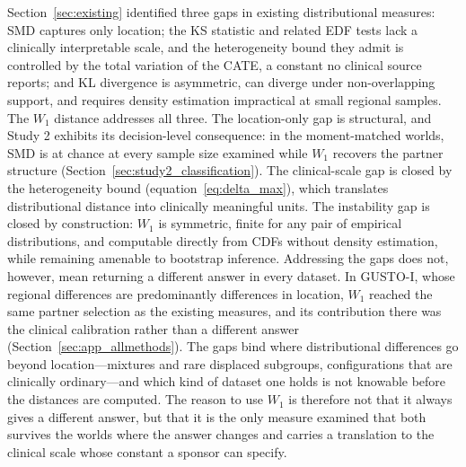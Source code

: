 \documentclass[AMA,Times1COL]{WileyNJDv5}
\begin{document}
Section~\ref{sec:existing} identified three gaps in existing distributional measures: SMD captures only location; the KS statistic and related EDF tests lack a clinically interpretable scale, and the heterogeneity bound they admit is controlled by the total variation of the CATE, a constant no clinical source reports; and KL divergence is asymmetric, can diverge under non-overlapping support, and requires density estimation impractical at small regional samples. The $W_1$ distance addresses all three. The location-only gap is structural, and Study 2 exhibits its decision-level consequence: in the moment-matched worlds, SMD is at chance at every sample size examined while $W_1$ recovers the partner structure (Section~\ref{sec:study2_classification}). The clinical-scale gap is closed by the heterogeneity bound (equation~\ref{eq:delta_max}), which translates distributional distance into clinically meaningful units. The instability gap is closed by construction: $W_1$ is symmetric, finite for any pair of empirical distributions, and computable directly from CDFs without density estimation, while remaining amenable to bootstrap inference. Addressing the gaps does not, however, mean returning a different answer in every dataset. In GUSTO-I, whose regional differences are predominantly differences in location, $W_1$ reached the same partner selection as the existing measures, and its contribution there was the clinical calibration rather than a different answer (Section~\ref{sec:app_allmethods}). The gaps bind where distributional differences go beyond location---mixtures and rare displaced subgroups, configurations that are clinically ordinary---and which kind of dataset one holds is not knowable before the distances are computed. The reason to use $W_1$ is therefore not that it always gives a different answer, but that it is the only measure examined that both survives the worlds where the answer changes and carries a translation to the clinical scale whose constant a sponsor can specify.
\end{document}
